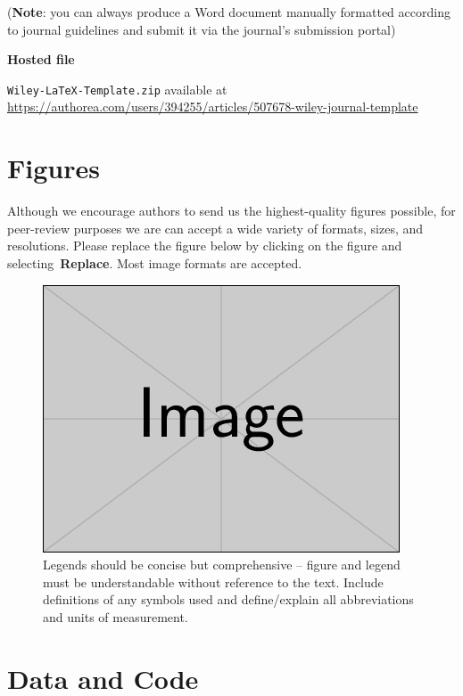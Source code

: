 \documentclass[alpha-refs]{wiley-article}
\begin{document}
(\textbf{Note}: you can always produce a Word document manually
formatted according to journal guidelines and submit it via the
journal's submission portal)~

\textbf{Hosted file}

\verb`Wiley-LaTeX-Template.zip` available at \url{https://authorea.com/users/394255/articles/507678-wiley-journal-template}

\par\null

\section*{Figures}

{\label{537325}}

Although we encourage authors to send us the highest-quality figures
possible, for peer-review purposes we are can accept a wide variety of
formats, sizes, and resolutions. Please replace the figure below by
clicking on the figure and selecting~\textbf{Replace}. Most image
formats are accepted.
\begin{figure}[h!]
\begin{center}
\includegraphics[width=0.70\columnwidth]{figures/example-image-rectangle/example-image-rectangle}
\caption{{Legends should be concise but comprehensive -- figure and legend must be
understandable without reference to the text. Include definitions of any
symbols used and define/explain all abbreviations and units of
measurement.
{\label{div-126281}}%
}}
\end{center}
\end{figure}

\par\null

\section*{\texorpdfstring{{Data and
Code}}{Data and Code}}
\end{document}
